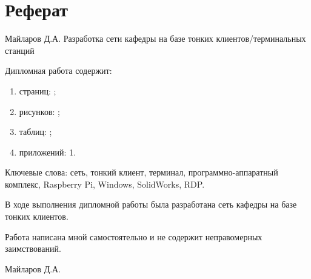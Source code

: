 \chapter*{Реферат}

Майларов Д.А. Разработка сети кафедры на базе тонких клиентов/терминальных станций

Дипломная работа содержит:
\begin{enumerate}
    \item страниц: \pageref{LastPage}; 
    \item рисунков: \totalfigures;
    \item таблиц: \totaltables;
    \item приложений: 1.
\end{enumerate}

Ключевые слова: сеть, тонкий клиент, терминал, программно-аппаратный комплекс,
Raspberry Pi, Windows, SolidWorks, RDP.

В ходе выполнения дипломной работы была разработана сеть кафедры на базе тонких
клиентов.

Работа написана мной самостоятельно и не содержит неправомерных заимствований.

\hspace*{\fill} Майларов Д.А.

